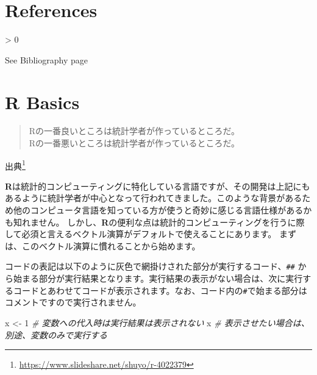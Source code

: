 \documentclass[
  12pt,
]{book}
\newenvironment{Shaded}{\begin{snugshade}}{\end{snugshade}}
\newcommand{\CommentTok}[1]{\textcolor[rgb]{0.56,0.35,0.01}{\textit{#1}}}
\newcommand{\DecValTok}[1]{\textcolor[rgb]{0.00,0.00,0.81}{#1}}
\newcommand{\NormalTok}[1]{#1}
\newcommand{\OtherTok}[1]{\textcolor[rgb]{0.56,0.35,0.01}{#1}}
\DeclareRobustCommand{\href}[2]{#2\footnote{\url{#1}}}
\newlength{\cslhangindent}
\newenvironment{CSLReferences}[2] %
 {%
  \setlength{\parindent}{0pt}
  \ifodd #1 \everypar{\setlength{\hangindent}{\cslhangindent}}\ignorespaces\fi
  \ifnum #2 > 0
  \setlength{\parskip}{#2\baselineskip}
  \fi
 }%
 {}
\begin{document}
\hypertarget{appendix-appendix}{%
\appendix {}}


\hypertarget{references}{%
\chapter*{References}\label{references}}

\hypertarget{refs}{}
\begin{CSLReferences}{0}{0}
\end{CSLReferences}

See Bibliography page

\hypertarget{Appendix-RBasics}{%
\chapter{R Basics}\label{Appendix-RBasics}}

\begin{quote}
Rの一番良いところは統計学者が作っているところだ。\\
Rの一番悪いところは統計学者が作っているところだ。
\end{quote}

\href{https://www.slideshare.net/shuyo/r-4022379}{出典}

\textbf{R}は統計的コンピューティングに特化している言語ですが、その開発は上記にもあるように統計学者が中心となって行われてきました。このような背景があるため他のコンピュータ言語を知っている方が使うと奇妙に感じる言語仕様があるかも知れません。 しかし、\textbf{R}の便利な点は統計的コンピューティングを行うに際して必須と言えるベクトル演算がデフォルトで使えることにあります。 まずは、このベクトル演算に慣れることから始めます。

コードの表記は以下のように灰色で網掛けされた部分が実行するコード、\texttt{\#\#} から始まる部分が実行結果となります。実行結果の表示がない場合は、次に実行するコードとあわせてコードが表示されます。なお、コード内の\texttt{\#}で始まる部分はコメントですので実行されません。

\begin{Shaded}
\begin{Highlighting}[]
\NormalTok{x }\OtherTok{\textless{}{-}} \DecValTok{1}        \CommentTok{\# 変数への代入時は実行結果は表示されない}
\NormalTok{x             }\CommentTok{\# 表示させたい場合は、別途、変数のみで実行する}
\end{Highlighting}
\end{Shaded}
\end{document}
